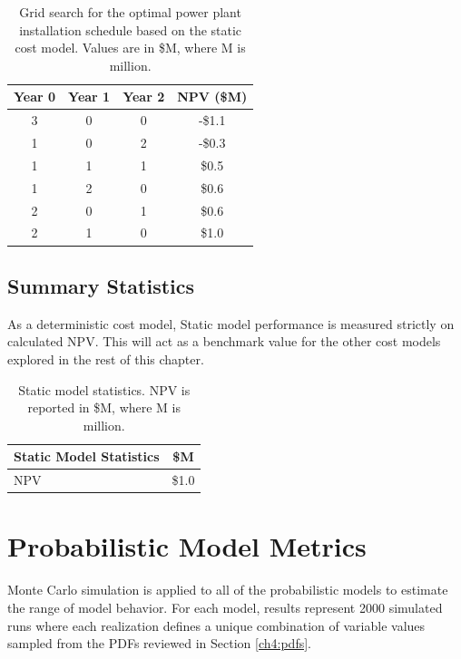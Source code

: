 \begin{table}[!htp]%
\centering
\begin{tabular}{|c|c|c|c|}
\hline
\textbf{Year 0} & \textbf{Year 1} & \textbf{Year 2} & \textbf{NPV (\$M)} \\ \hline
3 & 0 & 0 & -\$1.1 \\ \hline
1 & 0 & 2 & -\$0.3 \\ \hline
1 & 1 & 1 & \$0.5 \\ \hline
1 & 2 & 0 & \$0.6 \\ \hline
2 & 0 & 1 & \$0.6 \\ \hline
2 & 1 & 0 & \$1.0 \\ \hline
\end{tabular}
\caption[Static model module installation schedule]{Grid search for the optimal power plant installation schedule based on the static cost model. Values are in \$M, where M is million.}
\label{tab:static_optimization}
\end{table}

\subsection{Summary Statistics}
\label{ch6:static_stats}

As a deterministic cost model, Static model performance is measured strictly on calculated NPV. This will act as a benchmark value for the other cost models explored in the rest of this chapter.

\begin{table}[H]
\centering
\begin{tabular}{|l|c|}
\hline
\textbf{Static Model Statistics} & \textbf{\$M} \\ \hline
NPV & \$1.0 \\ \hline
\end{tabular}
\caption[Static model statistics]{Static model statistics. NPV is reported in \$M, where M is million.}
\label{tab:static_mod_stats}
\end{table}

\section{Probabilistic Model Metrics}
\label{ch6:cost_model_metrics}

Monte Carlo simulation is applied to all of the probabilistic models to estimate the range of model behavior. For each model, results represent 2000 simulated runs where each realization defines a unique combination of variable values sampled from the PDFs reviewed in Section \ref{ch4:pdfs}. 

